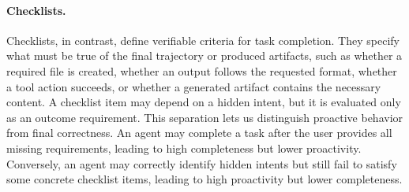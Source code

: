 \paragraph{Checklists.}
Checklists, in contrast, define verifiable criteria for task completion. They specify what must be true of the final trajectory or produced artifacts, such as whether a required file is created, whether an output follows the requested format, whether a tool action succeeds, or whether a generated artifact contains the necessary content. A checklist item may depend on a hidden intent, but it is evaluated only as an outcome requirement. This separation lets us distinguish proactive behavior from final correctness. An agent may complete a task after the user provides all missing requirements, leading to high completeness but lower proactivity. Conversely, an agent may correctly identify hidden intents but still fail to satisfy some concrete checklist items, leading to high proactivity but lower completeness.